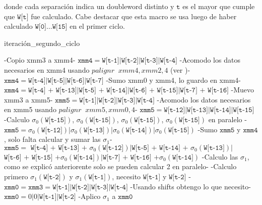 \noindent donde cada separación indica un doubleword distinto y $\texttt{t}$ es el mayor que cumple que $\texttt{W[t]}$ fue calculado. Cabe destacar que esta macro se usa luego de haber calculado $\texttt{W[0]} \dots \texttt{W[15]}$ en el primer ciclo. 

\begin{algorithm}[H]
\caption{iteración\_segundo\_ciclo}
\begin{algorithmic}[0]
    \State -Copio xmm3 a xmm4-
    \State $ \texttt{xmm4} = \texttt{W[t-1]} | \texttt{W[t-2]} | \texttt{W[t-3]}  |\texttt{W[t-4]} $
    \State
    \State -Acomodo los datos necesarios en xmm4 usando $palignr  \; \; xmm4, xmm2, 4$ (ver \cite{manualIntelinst} \cite{shaintelimp})- 
    \State $\texttt{xmm4} = \texttt{W[t-4]} | \texttt{W[t-5]} | \texttt{W[t-6]} | \texttt{W[t-7]} $
    \State
    \State -Sumo xmm0 y xmm4, lo guardo en xmm4-
    \State $\texttt{xmm4} = \texttt{W[t-4] + W[t-13]}|\texttt{W[t-5] + W[t-14]}|\texttt{W[t-6] + W[t-15]}|\texttt{W[t-7] + W[t-16]} $
    \State
    \State -Muevo xmm3 a xmm5-
    \State $ \texttt{xmm5} = \texttt{W[t-1]} | \texttt{W[t-2]} | \texttt{W[t-3]}  |\texttt{W[t-4]} $
    \State 
    \State -Acomodo los datos necesarios en xmm5 usando $palignr \; \; xmm5, xmm0, 4$- 
    \State $ \texttt{xmm5} = \texttt{W[t-12]} | \texttt{W[t-13]} | \texttt{W[t-14]}  |\texttt{W[t-15]} $
    \State
    \State -Calculo $\sigma_0(\texttt{W[t-15]})$, $\sigma_0(\texttt{W[t-15]})$, $\sigma_0(\texttt{W[t-15]})$, $\sigma_0(\texttt{W[t-15]})$ en paralelo -
    \State $ \texttt{xmm5} = \sigma_0(\texttt{W[t-12]}) | \sigma_0(\texttt{W[t-13]}) | \sigma_0(\texttt{W[t-14]}) |\sigma_0(\texttt{W[t-15]}) $
    \State
    \State -Sumo $\texttt{xmm5}$ y $\texttt{xmm4}$, solo falta calcular y sumar las $\sigma_1$-
    \State $ \texttt{xmm5} = \texttt{ W[t-4] + W[t-13] + } \sigma_0(\texttt{W[t-12]}) |\texttt{W[t-5] + W[t-14] + } \sigma_0(\texttt{W[t-13]})| $
    \State \indent \indent $ \texttt{W[t-6] + W[t-15] +} \sigma_0(\texttt{W[t-14]})|\texttt{W[t-7] + W[t-16] +} \sigma_0(\texttt{W[t-14]})$
    \State
    \State -Calculo las $\sigma_1$, como se explicó anteriorente solo se pueden calcular 2 en paralelo-
    \State -Calculo primero $\sigma_1(\texttt{W[t-2]})$ y $\sigma_1(\texttt{W[t-1]})$, necesito $\texttt{W[t-1]}$ y $\texttt{W[t-2]}$ -
    \State $ \texttt{xmm0} = \texttt{xmm3} = \texttt{W[t-1]} | \texttt{W[t-2]} | \texttt{W[t-3]}  |\texttt{W[t-4]} $
    \State -Usando shifts obtengo lo que necesito-
    \State $\texttt{xmm0} = 0 | 0 | \texttt{W[t-1]}  |\texttt{W[t-2]} $
    \State -Aplico $\sigma_1$ a $\texttt{xmm0}$

\end{algorithmic}
\end{algorithm}
